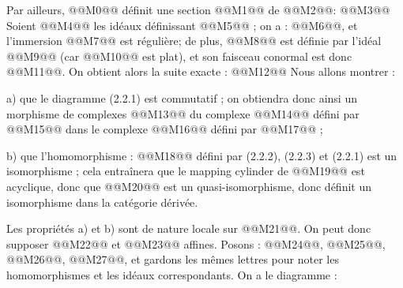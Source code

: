 

Par
ailleurs, @@M0@@ définit une section @@M1@@ de @@M2@@:
@@M3@@
Soient @@M4@@ les idéaux définissant @@M5@@ ; on a : @@M6@@, et l'immersion @@M7@@ est régulière; de plus, @@M8@@ est définie par l'idéal @@M9@@ (car @@M10@@ est plat), et son faisceau conormal est donc @@M11@@. On obtient alors la suite exacte :
@@M12@@
Nous allons montrer :

a) que le diagramme (2.2.1) est commutatif ; on obtiendra donc ainsi un morphisme de complexes @@M13@@ du complexe @@M14@@ défini par @@M15@@ dans le complexe @@M16@@ défini par @@M17@@ ;

b) que l'homomorphisme : @@M18@@ défini par (2.2.2), (2.2.3) et (2.2.1) est un isomorphisme ; cela entraînera que le mapping cylinder de @@M19@@ est acyclique, donc que @@M20@@ est un quasi-isomorphisme, donc définit un isomorphisme dans la catégorie dérivée.

Les propriétés a) et b) sont de nature locale sur @@M21@@. On peut donc supposer @@M22@@ et @@M23@@ affines. Posons : @@M24@@, @@M25@@, @@M26@@, @@M27@@, et gardons les mêmes lettres pour noter les homomorphismes et les idéaux correspondants. On a le diagramme :
